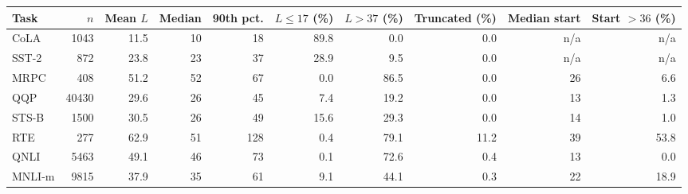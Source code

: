 \begin{tabular}{lrrrrrrrrr}
\toprule
Task & $n$ & Mean $L$ & Median & 90th pct. & $L\le17$ (\%) & $L>37$ (\%) & Truncated (\%) & Median start & Start $>36$ (\%) \\
\midrule
CoLA & 1043 & 11.5 & 10 & 18 & 89.8 & 0.0 & 0.0 & n/a & n/a \\
SST-2 & 872 & 23.8 & 23 & 37 & 28.9 & 9.5 & 0.0 & n/a & n/a \\
MRPC & 408 & 51.2 & 52 & 67 & 0.0 & 86.5 & 0.0 & 26 & 6.6 \\
QQP & 40430 & 29.6 & 26 & 45 & 7.4 & 19.2 & 0.0 & 13 & 1.3 \\
STS-B & 1500 & 30.5 & 26 & 49 & 15.6 & 29.3 & 0.0 & 14 & 1.0 \\
RTE & 277 & 62.9 & 51 & 128 & 0.4 & 79.1 & 11.2 & 39 & 53.8 \\
QNLI & 5463 & 49.1 & 46 & 73 & 0.1 & 72.6 & 0.4 & 13 & 0.0 \\
MNLI-m & 9815 & 37.9 & 35 & 61 & 9.1 & 44.1 & 0.3 & 22 & 18.9 \\
\bottomrule
\end{tabular}
